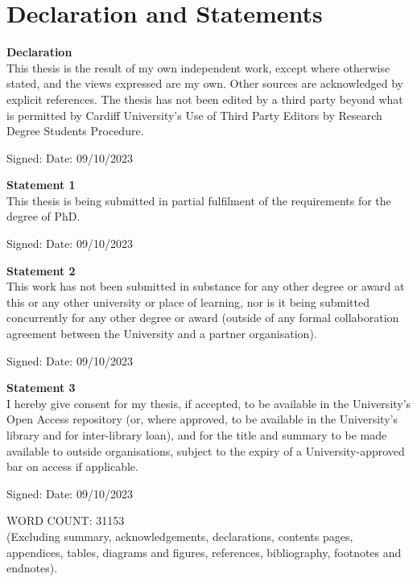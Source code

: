 \markboth{}{}
\chapter*{Declaration and Statements}
\label{chapter:Declaration and Statements}
\textbf{Declaration}\\
This thesis is the result of my own independent work, except where otherwise stated, and the views expressed are my own. Other sources are acknowledged by explicit references. The thesis has not been edited by a third party beyond what is permitted by Cardiff University's Use of Third Party Editors by Research Degree Students Procedure.

Signed:  Date: 09/10/2023


\textbf{Statement 1}\\
This thesis is being submitted in partial fulfilment of the requirements for the degree of PhD.

Signed:  Date: 09/10/2023

\textbf{Statement 2}\\
This work has not been submitted in substance for any other degree or award at this or any other university or place of learning, nor is it being submitted concurrently for any other degree or award (outside of any formal collaboration agreement between the University and a partner organisation).

Signed:  Date: 09/10/2023

\textbf{Statement 3}\\
I hereby give consent for my thesis, if accepted, to be available in the University’s Open Access repository (or, where approved, to be available in the University's library and for inter-library loan), and for the title and summary to be made available to outside organisations, subject to the expiry of a University-approved bar on access if applicable.

Signed:  Date: 09/10/2023

WORD COUNT: 31153\\
(Excluding summary, acknowledgements, declarations, contents pages, appendices, tables, diagrams and figures, references, bibliography, footnotes and endnotes).